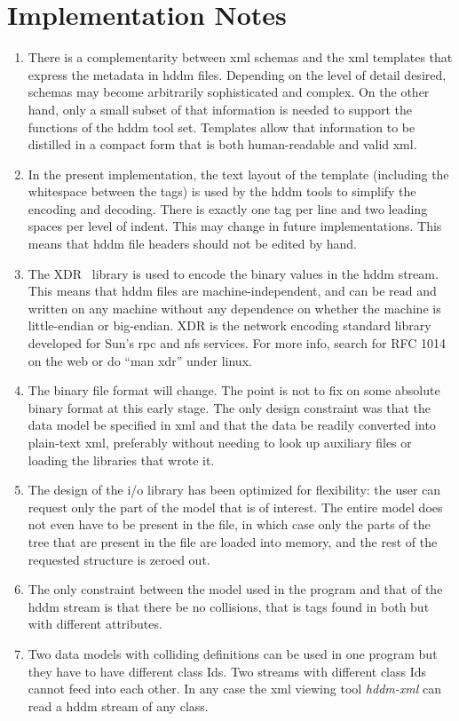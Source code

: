 \documentclass[10pt]{article}
\begin{document}
\section{Implementation Notes}
\begin{enumerate}
\item  There is a complementarity between xml schemas and the xml templates that express the metadata in hddm files. Depending on the level of detail desired, schemas may become arbitrarily sophisticated and complex. On the other hand, only a small subset of that information is needed to support the functions of the hddm tool set. Templates allow that information to be distilled in a compact form that is both human-readable and valid xml. 
\item  In the present implementation, the text layout of the template (including the whitespace between the tags) is used by the hddm tools to simplify the encoding and decoding. There is exactly one tag per line and two leading spaces per level of indent. This may change in future implementations. This means that hddm file headers should not be edited by hand. 
\item  The XDR~\cite{xdr} library is used to encode the binary values in the hddm stream. This means that hddm files are machine-independent, and can be read and written on any machine without any dependence on whether the machine is little-endian or big-endian. XDR is the network encoding standard library developed for Sun's rpc and nfs services. For more info, search for RFC 1014 on the web or do ``man xdr'' under linux. 
\item  The binary file format will change. The point is not to fix on some absolute binary format at this early stage. The only design constraint was that the data model be specified in xml and that the data be readily converted into plain-text xml, preferably without needing to look up auxiliary files or loading the libraries that wrote it. 
\item  The design of the i/o library has been optimized for flexibility: the user can request only the part of the model that is of interest. The entire model does not even have to be present in the file, in which case only the parts of the tree that are present in the file are loaded into memory, and the rest of the requested structure is zeroed out. 
\item  The only constraint between the model used in the program and that of the hddm stream is that there be no collisions, that is tags found in both but with different attributes. 
\item  Two data models with colliding definitions can be used in one program but they have to have different class Ids. Two streams with different class Ids cannot feed into each other. In any case the xml viewing tool \emph{hddm-xml}
 can read a hddm stream of any class. 

\end{enumerate}
\end{document}
